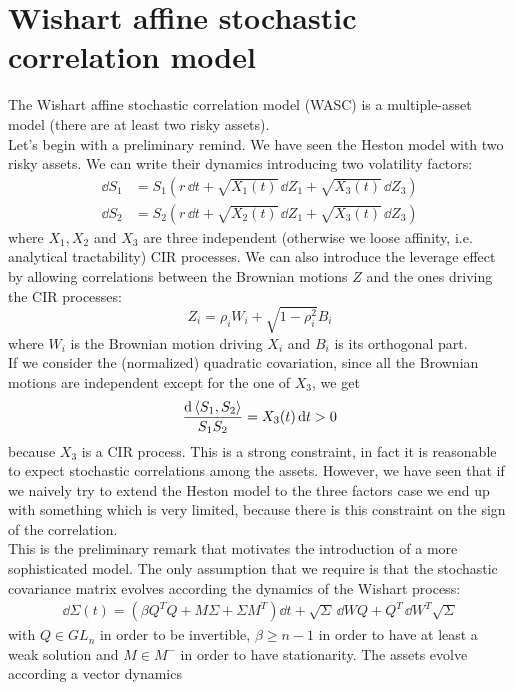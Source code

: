 \section{Wishart affine stochastic correlation model}
The Wishart affine stochastic correlation model (WASC) is a multiple-asset model (there are at least two risky assets). \\
Let's begin with a preliminary remind. We have seen the Heston model with two risky assets. We can write their dynamics introducing two volatility factors:
\begin{align*}
    \dd S_1 &= S_1(r\,\dd t + \sqrt{X_1(t)}\,\dd Z_1 + \sqrt{X_3(t)}\,\dd Z_3) \\
    \dd S_2 &= S_2(r\,\dd t + \sqrt{X_2(t)}\,\dd Z_1 + \sqrt{X_3(t)}\,\dd Z_3)
\end{align*}
where $X_1,X_2$ and $X_3$ are three independent (otherwise we loose affinity, i.e. analytical tractability) CIR processes. We can also introduce the leverage effect by allowing correlations between the Brownian motions $Z$ and the ones driving the CIR processes:
\begin{equation*}
    Z_i = \rho_iW_i + \sqrt{1-\rho_i^2}B_i
\end{equation*}
where $W_i$ is the Brownian motion driving $X_i$ and $B_i$ is its orthogonal part. \\
If we consider the (normalized) quadratic covariation, since all the Brownian motions are independent except for the one of $X_3$, we get
\begin{align*}
    \frac{\dd\expval{S_1,S_2}}{S_1S_2} = X_3(t) \,\dd t > 0
\end{align*}
because $X_3$ is a CIR process. This is a strong constraint, in fact it is reasonable to expect stochastic correlations among the assets. However, we have seen that if we naively try to extend the Heston model to the three factors case we end up with something which is very limited, because there is this constraint on the sign of the correlation.\\
This is the preliminary remark that motivates the introduction of a more sophisticated model. The only assumption that we require is that the stochastic covariance matrix evolves according the dynamics of the Wishart process:
\begin{align}
    \dd\Sigma(t) = (\beta Q^TQ + M\Sigma + \Sigma M^T)\dd t + \sqrt{\Sigma}\,\dd WQ + Q^T\,\dd W^T\sqrt{\Sigma}
\end{align}
with $Q\in GL_n$ in order to be invertible, $\beta\ge n-1$ in order to have at least a weak solution and $M\in M^-$ in order to have stationarity. The assets evolve according a vector dynamics
